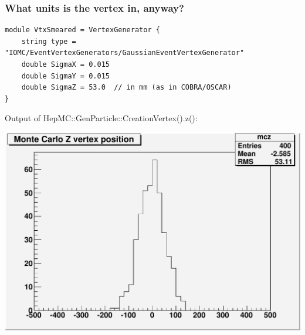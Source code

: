 \documentclass[12pt,compress]{beamer}
\begin{document}
\begin{frame}[fragile]
\frametitle{What units is the vertex in, anyway?}
\begin{minipage}{\linewidth}
\scriptsize
\begin{verbatim}
module VtxSmeared = VertexGenerator {
    string type = "IOMC/EventVertexGenerators/GaussianEventVertexGenerator"
    double SigmaX = 0.015
    double SigmaY = 0.015
    double SigmaZ = 53.0  // in mm (as in COBRA/OSCAR)
}
\end{verbatim}
\end{minipage}

\vspace{0.5 cm} \hspace{-0.8 cm}
Output of HepMC::GenParticle::CreationVertex().z():

\vspace{-0.3 cm}
\begin{center}
\includegraphics[width=0.5\linewidth]{mcz}
\end{center}
\end{frame}
\end{document}
